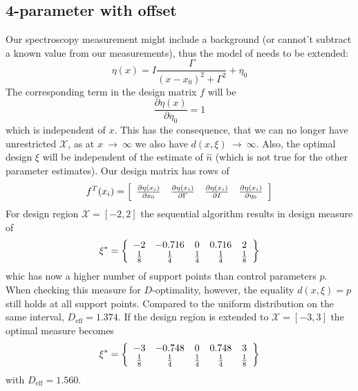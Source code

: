 \documentclass[12pt]{iopart}
\begin{document}
\subsection{4-parameter with offset}
\label{sec:4param}

Our spectroscopy measurement might include a background (or cannot't subtract a known value from our measurements), thus the model of  needs to be extended:
\begin{equation}
\eta(x) = I \frac{\Gamma}{(x - x_0)^2 + \Gamma^2} + \eta_0
\label{eq:lorentz4}
\end{equation}
The corresponding term in the design matrix $f$ will be
\begin{equation}
\frac{\partial \eta(x)}{\partial \eta_0} = 1
\end{equation}
which is independent of $x$. This has the consequence, that we can no longer have unrestricted $\mathcal{X}$, as at $x~\rightarrow~\infty$ we also have $d(x,\xi)~\rightarrow~\infty$. Also, the optimal design $\xi$ will be independent of the estimate of $\hat n$ (which is not true for the other parameter estimates). Our design matrix has rows of
\begin{equation}
 f^T(x_i) = \left[
  \begin{array}{l l l l}
   \frac{\partial \eta(x_i)}{\partial x_0} & \frac{\partial \eta(x_i)}{\partial \Gamma} & \frac{\partial \eta(x_i)}{\partial I} & \frac{\partial \eta(x_i)}{\partial \eta_0}
  \end{array} \right ]
\end{equation}
For design region $\mathcal{X} = [-2, 2]$ the sequential algorithm results in design measure of
\begin{equation}
\xi^* = \left\{
  \begin{array}{c c c c c}
    -2 & -0.716 & 0 & 0.716 & 2\\
    \frac{1}{8} & \frac{1}{4} & \frac{1}{4} & \frac{1}{4} & \frac{1}{8}\\
  \end{array} \right \}
\end{equation}
whic has now a higher number of support points than control parameters $p$. When checking this measure for $D$-optimality, however, the equality $d(x, \xi) = p$ still holds at all support points. Compared to the uniform distribution on the same interval, $D_\mathrm{eff} = 1.374$. If the design region is extended to $\mathcal{X} = [-3, 3]$ the optimal measure becomes
\begin{equation}
\xi^* = \left\{
  \begin{array}{c c c c c}
    -3 & -0.748 & 0 & 0.748 & 3\\
    \frac{1}{8} & \frac{1}{4} & \frac{1}{4} & \frac{1}{4} & \frac{1}{8}\\
  \end{array} \right \}
\end{equation}
with $D_\mathrm{eff} = 1.560$.
\end{document}
